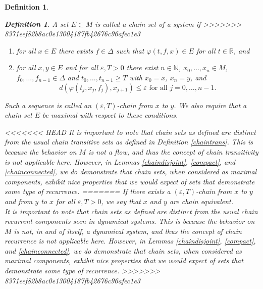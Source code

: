 \documentclass[11pt]{article}
\newtheorem{defn}[thm]{Definition}
\begin{document}
\begin{defn}
\begin{defn} \label{chain set} A set $E\subset M$ is called a chain set of a system if 
>>>>>>> 8371eef82b8ac0e13004187fb42676c96afec1e3
\begin{enumerate}
\item for all $x\in E$ there exists $f\in\Delta$ such that $\varphi(t,f,x)\in E$ for all $t\in\mathbb{R}$, and\\
\item for all $x,y\in E$ and for all $\varepsilon,T>0$ there exist $n\in\mathbb{N}$, $x_0,\ldots,x_n\in M$, $f_0,\ldots,f_{n-1}\in\Delta$ and $t_0,\ldots,t_{n-1}\geq T$ with $x_0=x$, $x_n=y$, and 
$$d(\varphi(t_j,x_j,f_j),x_{j+1})\leq\varepsilon\mbox{ for all }j=0,\ldots,n-1.$$
\end{enumerate}
Such a sequence is called an $(\varepsilon,T)$-chain from $x$ to $y$. We also require that a chain set $E$ be maximal with respect to these conditions.
\end{defn}
<<<<<<< HEAD
\indent It is important to note that chain sets as defined are distinct from the usual chain transitive sets as defined in Definition \ref{chaintrans}.  This is because the behavior on $M$ is not a flow, and thus the concept of chain transitivity is not applicable here.  However, in Lemmas \ref{chaindisjoint}, \ref{compact},  and \ref{chainconnected}, we do demonstrate that chain sets, when considered as maximal components, exhibit nice properties that we would expect of sets that demonstrate some type of recurrence. 
=======
If there exists a $(\varepsilon,T)$-chain from $x$ to $y$ and from $y$ to $x$ for all $\varepsilon, T>0$, we say that $x$ and $y$ are chain equivalent.\\
\indent It is important to note that chain sets as defined are distinct from the usual chain recurrent components seen in dynamical systems.  This is because the behavior on $M$ is not, in and of itself, a dynamical system, and thus the concept of chain recurrence is not applicable here.  However, in Lemmas \ref{chaindisjoint}, \ref{compact},  and \ref{chainconnected}, we do demonstrate that chain sets, when considered as maximal components, exhibit nice properties that we would expect of sets that demonstrate some type of recurrence. 
>>>>>>> 8371eef82b8ac0e13004187fb42676c96afec1e3



\end{defn}
\end{document}
